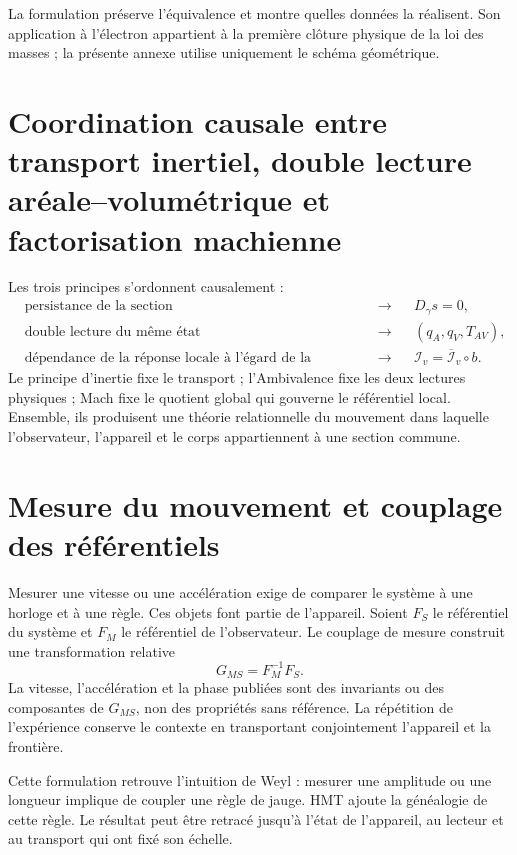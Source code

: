 La formulation préserve l'équivalence et montre quelles données la réalisent. Son
application à l'électron appartient à la première clôture physique de la loi des
masses ; la présente annexe utilise uniquement le schéma géométrique.

\section{Coordination causale entre transport inertiel, double lecture aréale–volumétrique et factorisation machienne}

Les trois principes s'ordonnent causalement :
\begin{equation}
 \boxed{
 \begin{aligned}
 &\text{persistance de la section}
   &&\longrightarrow&& D_\gamma s=0,\\
 &\text{double lecture du même état}
   &&\longrightarrow&& (q_A,q_V,T_{AV}),\\
 &\text{dépendance de la réponse locale à l'égard de la totalité}
   &&\longrightarrow&& \mathcal I_v=\overline{\mathcal I}_v\circ b.
 \end{aligned}}
 \label{eq:triptico-inercia-mach}
\end{equation}
Le principe d'inertie fixe le transport ; l'Ambivalence fixe les deux
lectures physiques ; Mach fixe le quotient global qui gouverne le référentiel local.
Ensemble, ils produisent une théorie relationnelle du mouvement dans laquelle l'observateur,
l'appareil et le corps appartiennent à une section commune.

\section{Mesure du mouvement et couplage des référentiels}

Mesurer une vitesse ou une accélération exige de comparer le système à une horloge et à une
règle. Ces objets font partie de l'appareil. Soient \(F_S\) le référentiel du système
et \(F_M\) le référentiel de l'observateur. Le couplage de mesure construit une
transformation relative
\[
 G_{MS}=F_M^{-1}F_S.
\]
La vitesse, l'accélération et la phase publiées sont des invariants ou des
composantes de \(G_{MS}\), non des propriétés sans référence. La répétition de
l'expérience conserve le contexte en transportant conjointement l'appareil et la
frontière.

Cette formulation retrouve l'intuition de Weyl \cite{Weyl1927} : mesurer une amplitude ou une
longueur implique de coupler une règle de jauge. HMT ajoute la généalogie de cette
règle. Le résultat peut être retracé jusqu'à l'état de l'appareil, au lecteur et au
transport qui ont fixé son échelle.

